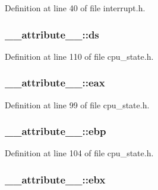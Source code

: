 \-Definition at line 40 of file interrupt.\-h.

\hypertarget{struct____attribute_____a002aae153df8aab34a7ebe41e1715cbd}{
\subsubsection[{ds}]{ {\bf \-\_\-\-\_\-attribute\-\_\-\-\_\-\-::ds}}}\label{struct____attribute_____a002aae153df8aab34a7ebe41e1715cbd}


\-Definition at line 110 of file cpu\-\_\-state.\-h.

\hypertarget{struct____attribute_____a4a1e72b80d7e5e292929f5ec4031e0a5}{
\subsubsection[{eax}]{ {\bf \-\_\-\-\_\-attribute\-\_\-\-\_\-\-::eax}}}\label{struct____attribute_____a4a1e72b80d7e5e292929f5ec4031e0a5}


\-Definition at line 99 of file cpu\-\_\-state.\-h.

\hypertarget{struct____attribute_____a36e8763e165b31e0b522068d268cc422}{
\subsubsection[{ebp}]{ {\bf \-\_\-\-\_\-attribute\-\_\-\-\_\-\-::ebp}}}\label{struct____attribute_____a36e8763e165b31e0b522068d268cc422}


\-Definition at line 104 of file cpu\-\_\-state.\-h.

\hypertarget{struct____attribute_____a7d7fc34555a28044240e2bb590d54a01}{
\subsubsection[{ebx}]{ {\bf \-\_\-\-\_\-attribute\-\_\-\-\_\-\-::ebx}}}\label{struct____attribute_____a7d7fc34555a28044240e2bb590d54a01}


